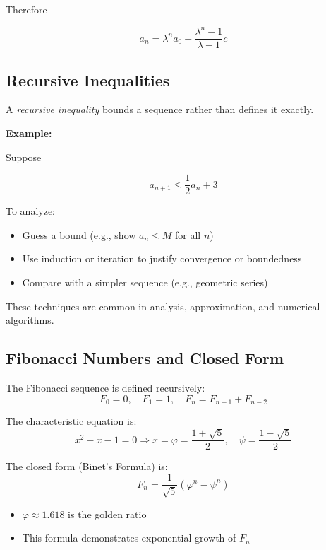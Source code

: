 Therefore

\[a_n = \lambda^n a_0 + \frac{\lambda^n - 1}{\lambda - 1}c\]

\subsection{Recursive Inequalities}

A \emph{recursive inequality} bounds a sequence rather than defines it exactly.
\vspace{\baselineskip}

\textbf{Example:}
\vspace{\baselineskip}

Suppose

\[
a_{n+1} \le \frac{1}{2} a_n + 3
\]

To analyze:
\begin{itemize}[label=\(-\)]
    \item Guess a bound (e.g., show \( a_n \le M \) for all \( n \))
    \item Use induction or iteration to justify convergence or boundedness
    \item Compare with a simpler sequence (e.g., geometric series)
\end{itemize}

These techniques are common in analysis, approximation, and numerical algorithms.

\subsection{Fibonacci Numbers and Closed Form}

The Fibonacci sequence is defined recursively:
\[
F_0 = 0, \quad F_1 = 1, \quad F_n = F_{n-1} + F_{n-2}
\]

The characteristic equation is:
\[
x^2 - x - 1 = 0 \Rightarrow x = \varphi = \frac{1 + \sqrt{5}}{2}, \quad \psi = \frac{1 - \sqrt{5}}{2}
\]

The closed form (Binet’s Formula) is:
\[
F_n = \frac{1}{\sqrt{5}} \left( \varphi^n - \psi^n \right)
\]

\begin{itemize}[label=\(-\)]
    \item \( \varphi \approx 1.618 \) is the golden ratio
    \item This formula demonstrates exponential growth of \( F_n \)
\end{itemize}

